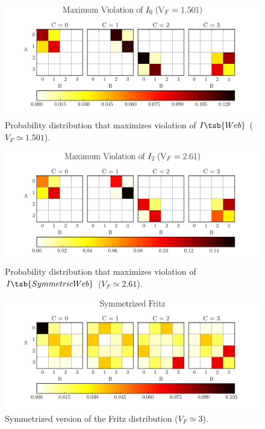\documentclass[aps, 10pt, english, twoside, pra, nofootinbib, tightenlines, longbibliography, superscriptaddress]{revtex4-1}
\begin{document}
    \begin{figure}
    \begin{center}
            \includegraphics[scale=0.6,trim={0 0 0 0.4in},clip]{../../figures/distributions/plotted_dist_I_1_max_violation_2017.pdf}
            \caption{Probability distribution that maximizes violation of $I\tsb{Web}$ ($V_F \simeq 1.501$).}
            \label{fig:maximum_violation_I_1}
    \end{center}
    \end{figure}
    \begin{figure}
    \begin{center}
            \includegraphics[scale=0.6,trim={0 0 0 0.4in},clip]{../../figures/distributions/plotted_dist_I_3_max_violation_2017.pdf}
            \caption{Probability distribution that maximizes violation of $I\tsb{SymmetricWeb}$ ($V_F \simeq 2.61$).}
            \label{fig:maximum_violation_I_3}
    \end{center}
    \end{figure}
    \begin{figure}
    \begin{center}
            \includegraphics[scale=0.6,trim={0 0 0 0.4in},clip]{../../figures/distributions/symmetrized_fritz.pdf}
            \caption{Symmetrized version of the Fritz distribution ($V_F \simeq 3$).}
            \label{fig:symmetrized_fritz}
    \end{center}
    \end{figure}
\end{document}
